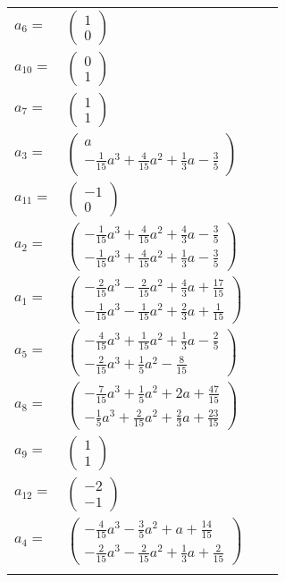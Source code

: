 \documentclass[1p]{elsarticle_modified}
\theoremstyle{definition}
\begin{document}
\begin{tabular}{m{7pt} m{180pt} m{7pt} m{180pt} }
\flushright $a_{6}=$&$\begin{pmatrix}1\\0\end{pmatrix}$ \\
\flushright $a_{10}=$&$\begin{pmatrix}0\\1\end{pmatrix}$ \\
\flushright $a_{7}=$&$\begin{pmatrix}1\\1\end{pmatrix}$ \\
\flushright $a_{3}=$&$\begin{pmatrix}a\\-\frac{1}{15} a^3+\frac{4}{15} a^2+\frac{1}{3} a-\frac{3}{5}\end{pmatrix}$ \\
\flushright $a_{11}=$&$\begin{pmatrix}-1\\0\end{pmatrix}$ \\
\flushright $a_{2}=$&$\begin{pmatrix}-\frac{1}{15} a^3+\frac{4}{15} a^2+\frac{4}{3} a-\frac{3}{5}\\-\frac{1}{15} a^3+\frac{4}{15} a^2+\frac{1}{3} a-\frac{3}{5}\end{pmatrix}$ \\
\flushright $a_{1}=$&$\begin{pmatrix}-\frac{2}{15} a^3-\frac{2}{15} a^2+\frac{4}{3} a+\frac{17}{15}\\-\frac{1}{15} a^3-\frac{1}{15} a^2+\frac{2}{3} a+\frac{1}{15}\end{pmatrix}$ \\
\flushright $a_{5}=$&$\begin{pmatrix}-\frac{4}{15} a^3+\frac{1}{15} a^2+\frac{1}{3} a-\frac{2}{5}\\-\frac{2}{15} a^3+\frac{1}{5} a^2-\frac{8}{15}\end{pmatrix}$ \\
\flushright $a_{8}=$&$\begin{pmatrix}-\frac{7}{15} a^3+\frac{1}{5} a^2+2 a+\frac{47}{15}\\-\frac{1}{5} a^3+\frac{2}{15} a^2+\frac{2}{3} a+\frac{23}{15}\end{pmatrix}$ \\
\flushright $a_{9}=$&$\begin{pmatrix}1\\1\end{pmatrix}$ \\
\flushright $a_{12}=$&$\begin{pmatrix}-2\\-1\end{pmatrix}$ \\
\flushright $a_{4}=$&$\begin{pmatrix}-\frac{4}{15} a^3-\frac{3}{5} a^2+a+\frac{14}{15}\\-\frac{2}{15} a^3-\frac{2}{15} a^2+\frac{1}{3} a+\frac{2}{15}\end{pmatrix}$\\&\end{tabular}
\end{document}
